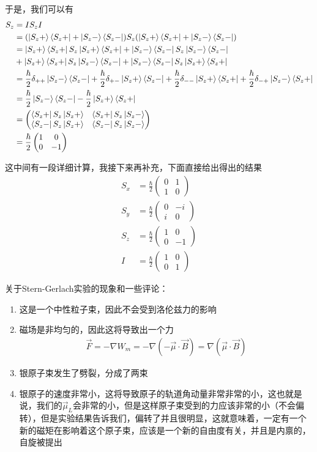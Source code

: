 \documentclass{article}
\newcommand{\pmtwo}[4]{\begin{pmatrix}#1&#2\\#3&#4\end{pmatrix}}
\begin{document}
于是，我们可以有
\begin{align*}
    S_z&=IS_zI\\
    &=(\ket{S_z+}\bra{S_z+}+\ket{S_z-}\bra{S_z-})S_z(\ket{S_z+}\bra{S_z+}+\ket{S_z-}\bra{S_z-})\\
    &=\ket{S_z+}\bra{S_z+}S_z\ket{S_z+}\bra{S_z+}+\ket{S_z-}\bra{S_z-}S_z\ket{S_z-}\bra{S_z-}\\
    &+\ket{S_z+}\bra{S_z+}S_z\ket{S_z-}\bra{S_z-}+\ket{S_z-}\bra{S_z-}S_z\ket{S_z+}\bra{S_z+}\\
    &=\frac{\hbar}{2}\delta_{++}\ket{S_z-}\bra{S_z-}+\frac{\hbar}{2}\delta_{+-}\ket{S_z+}\bra{S_z-}+\frac{\hbar}{2}\delta_{--}\ket{S_z+}\bra{S_z+}+\frac{\hbar}{2}\delta_{-+}\ket{S_z-}\bra{S_z+}\\
    &=\frac{\hbar}{2}\ket{S_z-}\bra{S_z-}-\frac{\hbar}{2}\ket{S_z+}\bra{S_z+}\\
    &=\pmtwo{\bra{S_z+}S_z\ket{S_z+}}{\bra{S_z+}S_z\ket{S_z-}}{\bra{S_z-}S_z\ket{S_z+}}{\bra{S_z-}S_z\ket{S_z-}}\\
    &=\frac{\hbar}{2}\pmtwo{1}{0}{0}{-1}
\end{align*}

这中间有一段详细计算，我接下来再补充，下面直接给出得出的结果
\begin{align*}
    S_x&=\frac{\hbar}{2}\pmtwo{0}{1}{1}{0}\\
    S_y&=\frac{\hbar}{2}\pmtwo{0}{-i}{i}{0}\\
    S_z&=\frac{\hbar}{2}\pmtwo{1}{0}{0}{-1}\\
    I&=\frac{\hbar}{2}\pmtwo{1}{0}{0}{1}
\end{align*}

关于Stern-Gerlach实验的现象和一些评论：
\begin{enumerate}
    \item 这是一个中性粒子束，因此不会受到洛伦兹力的影响
    \item 磁场是非均匀的，因此这将导致出一个力
    \begin{align*}
        \vec{F}=-\nabla W_m=-\nabla\left(-\vec{\mu}\cdot\vec{B}\right)=\nabla\left(\vec{\mu}\cdot\vec{B}\right)
    \end{align*}
    \item 银原子束发生了劈裂，分成了两束
    \item 银原子的速度非常小，这将导致原子的轨道角动量非常非常的小，这也就是说，我们的$\vec{\mu}_L$会非常的小，但是这样原子束受到的力应该非常的小（不会偏转），但是实验结果告诉我们，偏转了并且很明显，这就意味着，一定有一个新的磁矩在影响着这个原子束，应该是一个新的自由度有关，并且是内禀的，自旋被提出
\end{enumerate}
\end{document}
